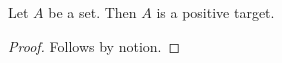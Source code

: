 

\begin{proposition}\label{horn_positive_parameter_missing}
    Let $A$ be a set.
    Then $A$ is a positive target.
\end{proposition}
\begin{proof}
    Follows by notion.
\end{proof}
